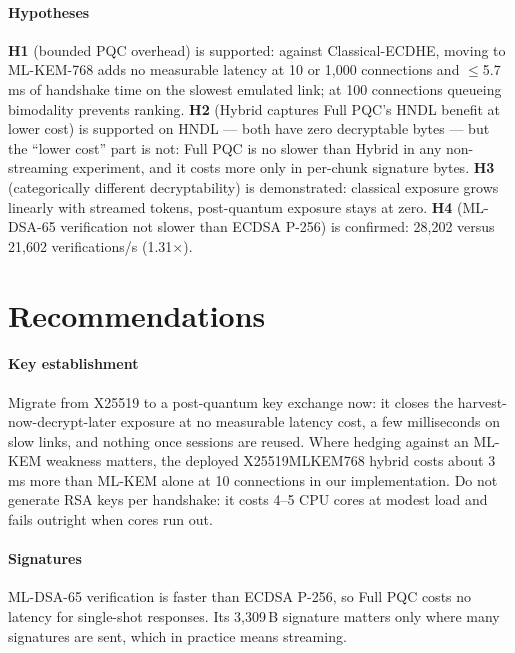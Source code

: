 \paragraph*{Hypotheses} \textbf{H1} (bounded PQC overhead) is supported: against Classical-ECDHE,
moving to ML-KEM-768 adds no measurable latency at 10 or 1,000 connections and $\le$5.7\,ms of
handshake time on the slowest emulated link; at 100 connections queueing bimodality prevents
ranking. \textbf{H2} (Hybrid captures Full PQC's HNDL benefit at lower cost) is supported on HNDL
--- both have zero decryptable bytes --- but the ``lower cost'' part is not: Full PQC is no slower
than Hybrid in any non-streaming experiment, and it costs more only in per-chunk signature bytes.
\textbf{H3} (categorically different decryptability) is demonstrated: classical exposure grows
linearly with streamed tokens, post-quantum exposure stays at zero. \textbf{H4} (ML-DSA-65
verification not slower than ECDSA P-256) is confirmed: 28,202 versus 21,602 verifications/s
(1.31$\times$).

\section{Recommendations}
\paragraph*{Key establishment} Migrate from X25519 to a post-quantum key exchange now: it closes the
harvest-now-decrypt-later exposure at no measurable latency cost, a few milliseconds on slow
links, and nothing once sessions are reused. Where hedging against an ML-KEM weakness matters,
the deployed X25519MLKEM768 hybrid costs about 3\,ms more than ML-KEM alone at 10 connections in our
implementation. Do not generate RSA keys per handshake: it costs 4--5 CPU cores at modest load and
fails outright when cores run out.

\paragraph*{Signatures} ML-DSA-65 verification is faster than ECDSA P-256, so Full PQC costs no
latency for single-shot responses. Its 3,309\,B signature matters only where many signatures are
sent, which in practice means streaming.


